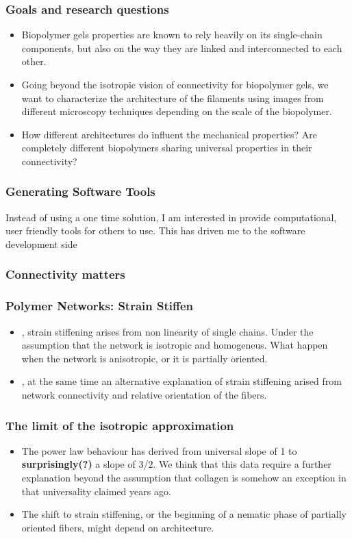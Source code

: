 \documentclass[10pt]{beamer}
\begin{document}
\begin{frame}
  \frametitle{Goals and research questions}
  \begin{itemize}
      \item Biopolymer gels properties are known to rely heavily on its single-chain components, but also on the way they are linked and interconnected to each other.
      \item Going beyond the isotropic vision of connectivity for biopolymer gels, we want to characterize the architecture of the filaments using images from different microscopy techniques depending on the scale of the biopolymer.
      \item How different architectures do influent the mechanical properties? Are completely different biopolymers sharing universal properties in their connectivity?
  \end{itemize}
\end{frame}
\begin{frame}
    \frametitle{Generating Software Tools}
    \centering

    \note
    {
        Instead of using a one time solution, I am interested in provide computational, user friendly tools for others to use.\newline
        This has driven me to the software development side
    }

\end{frame}
\begin{frame}
  \frametitle{Connectivity matters}

\end{frame}
\begin{frame}
    \frametitle{Polymer Networks: Strain Stiffen}
    \begin{itemize}
        \item \cite{Storm}, strain stiffening arises from non linearity of single chains.
            Under the assumption that the network is isotropic and homogeneus.
            What happen when the network is anisotropic, or it is partially oriented.
        \item  \cite{hola}, at the same time an alternative explanation of strain stiffening arised from
    network connectivity and relative orientation of the fibers.
    \end{itemize}
\end{frame}
\begin{frame}
    \frametitle{The limit of the isotropic approximation}
    \begin{itemize}
        \item The power law behaviour has derived from universal slope of 1 \cite{mackintosh_bill} to \textbf{surprisingly(?)} a slope of  3/2. We think that this data require a further explanation beyond the assumption that collagen is somehow an exception in that universality claimed years ago.
        \item The shift to strain stiffening, or the beginning of a nematic phase of partially oriented fibers, might depend on architecture.
    \end{itemize}
\end{frame}
\end{document}
